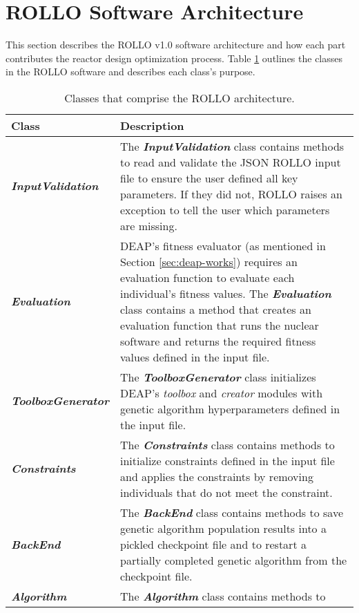 \section{ROLLO Software Architecture}
\label{sec:rollo-archi}
This section describes the \gls{ROLLO} v1.0 software architecture and 
how each part contributes the reactor design optimization process.
Table \ref{tab:rollo-architecture} outlines the classes in the \gls{ROLLO} software 
and describes each class's purpose.
\begin{table}[htbp]
    \centering
    \onehalfspacing
    \caption{Classes that comprise the \gls{ROLLO} architecture. }
	\label{tab:rollo-architecture}
    \footnotesize
    \begin{tabular}{l|p{}}
    \hline
    \textbf{Class} & \textbf{Description} \\ \hline
    \textbf{\textit{InputValidation}} & The \textbf{\textit{InputValidation}} class contains methods 
    to read and validate the JSON \gls{ROLLO} input file to 
    ensure the user defined all key parameters. If they did not, \gls{ROLLO} 
    raises an exception to tell the user which parameters are missing. \\
    \hline
    \textbf{\textit{Evaluation}} & \gls{DEAP}'s fitness evaluator (as mentioned in Section 
    \ref{sec:deap-works}) requires an evaluation function to evaluate each 
    individual's fitness values. 
    The \textbf{\textit{Evaluation}} class contains a method that creates an evaluation 
    function that runs the nuclear software and returns the required fitness values
    defined in the input file. \\
    \hline 
    \textbf{\textit{ToolboxGenerator}} & The \textbf{\textit{ToolboxGenerator}} class initializes
    \gls{DEAP}'s \textit{toolbox} and \textit{creator} modules with genetic algorithm 
    hyperparameters defined in the input file.\\
    \hline
    \textbf{\textit{Constraints}} & The \textbf{\textit{Constraints}} class 
    contains methods to initialize constraints defined in the input file 
    and applies the constraints by removing individuals that do not meet the 
    constraint.\\
    \hline 
    \textbf{\textit{BackEnd}} & The \textbf{\textit{BackEnd}} class contains methods to save 
    genetic algorithm population results into a pickled checkpoint file and to 
    restart a partially completed genetic algorithm from the checkpoint file. \\
    \hline
    \textbf{\textit{Algorithm}} & The \textbf{\textit{Algorithm}} class contains methods to 

\end{tabular}
\end{table}
